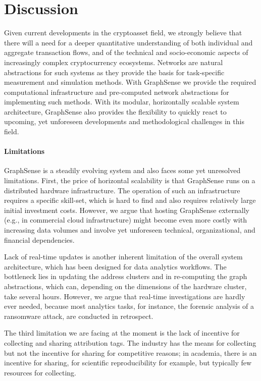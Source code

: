 \section{Discussion}\label{sec:discussion}

Given current developments in the cryptoasset field, we strongly believe that there will a need for a deeper quantitative understanding of both individual and aggregate transaction flows, and of the technical and socio-economic aspects of increasingly complex cryptocurrency ecosystems. Networks are natural abstractions for such systems as they provide the basis for task-specific measurement and simulation methods. With GraphSense we provide the required computational infrastructure and pre-computed network abstractions for implementing such methods. With its modular, horizontally scalable system architecture, GraphSense also provides the flexibility to quickly react to upcoming, yet unforeseen developments and methodological challenges in this field.

\paragraph{Limitations} GraphSense is a steadily evolving system and also faces some yet unresolved limitations. First, the price of horizontal scalability is that GraphSense runs on a distributed hardware infrastructure. The operation of such an infrastructure requires a specific skill-set, which is hard to find and also requires relatively large initial investment costs. However, we argue that hosting GraphSense externally (e.g., in commercial cloud infrastructure) might become even more costly with increasing data volumes and involve yet unforeseen technical, organizational, and financial dependencies.

Lack of real-time updates is another inherent limitation of the overall system architecture, which has been designed for data analytics workflows. The bottleneck lies in updating the address clusters and in re-computing the graph abstractions, which can, depending on the dimensions of the hardware cluster, take several hours. However, we argue that real-time investigations are hardly ever needed, because most analytics tasks, for instance, the forensic analysis of a ransomware attack, are conducted in retrospect.

The third limitation we are facing at the moment is the lack of incentive for collecting and sharing attribution tags. The industry has the means for collecting but not the incentive for sharing for competitive reasons; in academia, there is an incentive for sharing, for scientific reproducibility for example, but typically few resources for collecting.

